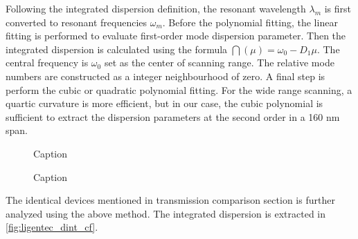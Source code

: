 Following the integrated dispersion definition, the resonant wavelength $\lambda_m$ is first converted to resonant frequencies $\omega_m$. Before the polynomial fitting, the linear fitting is performed to evaluate first-order mode dispersion parameter. Then the integrated dispersion is calculated using the formula $ \dint(\mu) = \omega_0 - D_1 \mu$. The central frequency is $\omega_0$ set as the center of scanning range. The relative mode numbers are constructed as a integer neighbourhood of zero. A final step is perform the cubic or quadratic polynomial fitting. For the wide range scanning, a quartic curvature is more efficient, but in our case, the cubic polynomial is sufficient to extract the dispersion parameters at the second order in a 160 nm span.


\begin{figure}
	\centering
	
	\caption{Caption}
	\label{fig:dint_cf}
\end{figure}

\begin{figure}
	\centering
	
	\caption{Caption}
	\label{fig:ligentec_dint_cf}
\end{figure}


The identical devices mentioned in transmission comparison section is further analyzed using the above method. The integrated dispersion is extracted in \autoref{fig:ligentec_dint_cf}.



